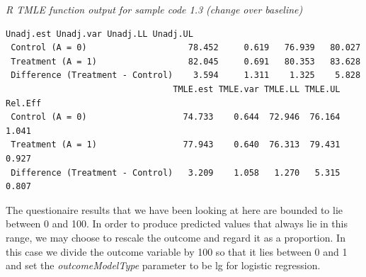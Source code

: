 \documentclass[10pt]{article}
\renewcommand{\baselinestretch}{1.3}
\begin{document}
\begin{minipage}{\textwidth}
\renewcommand{\baselinestretch}{1.0}\selectfont%
\begin{minipage}[l]{5.6in}
\normalsize\em%
R TMLE function output for sample code 1.3 (change over baseline)
\end{minipage}\vspace{-0.08in}
\begin{Verbatim}[baselinestretch=1.0, fontsize=\small, frame=single, commandchars=\\\{\}]
                                 Unadj.est Unadj.var Unadj.LL Unadj.UL
 Control (A = 0)                    78.452     0.619   76.939   80.027
 Treatment (A = 1)                  82.045     0.691   80.353   83.628
 Difference (Treatment - Control)    3.594     1.311    1.325    5.828
                                 TMLE.est TMLE.var TMLE.LL TMLE.UL Rel.Eff
 Control (A = 0)                   74.733    0.644  72.946  76.164   1.041
 Treatment (A = 1)                 77.943    0.640  76.313  79.431   0.927
 Difference (Treatment - Control)   3.209    1.058   1.270   5.315   0.807
\end{Verbatim}
\end{minipage}
\vspace{0.2in}
\newpage
The questionaire results that we have been looking at here are bounded to lie between 0 and 100.  In order to produce predicted values that always lie in this range, we may choose to rescale the outcome and regard it as a proportion.  In this case we divide the outcome variable by 100 so that it lies between 0 and 1 and set the {\em outcomeModelType} parameter to be lg for logistic regression.
\vspace{0.1in}
\end{document}
